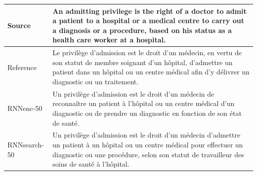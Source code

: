 \documentclass{article} %
\begin{document}
\begin{table}[htp]
    \begin{minipage}{0.99\textwidth}
        \small
        \centering
        \begin{tabular}{p{1.9cm} | p{12cm}}
\hline Source & An admitting privilege is the right of a doctor to admit a patient to a hospital or a medical centre to carry out a diagnosis or a procedure, based on his status as a health care worker at a hospital.
\\
\hline Reference & Le privilège d'admission est le droit d'un m\'edecin, en vertu de son statut de membre soignant d'un h\^opital, d'admettre un patient dans un h\^opital ou un centre m\'edical afin d'y d\'elivrer un diagnostic ou un traitement.
\\
\hline RNNenc-50 & Un privilège d'admission est le droit d'un m\'edecin de reconnaître un patient à l'h\^opital ou un centre m\'edical d'un diagnostic ou de prendre un diagnostic en fonction de son \'etat de sant\'e.
\\
\hline RNNsearch-50 & Un privilège d'admission est le droit d'un m\'edecin d'admettre un patient à un h\^opital ou un centre m\'edical pour effectuer un diagnostic ou une proc\'edure, selon son statut de travailleur des soins de sant\'e à l'h\^opital.
\\

\end{tabular}
\end{minipage}
\end{table}
\end{document}
